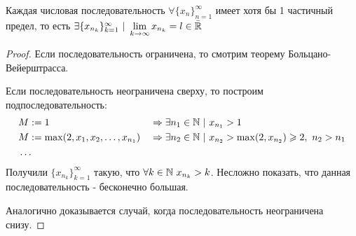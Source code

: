 \begin{addition}
	Каждая числовая последовательность $\forall \{x_n\}_{n = 1}^\infty$ имеет хотя бы 1 частичный предел, то есть $\exists \{x_{n_k}\}_{k = 1}^\infty\ |\ \lim\limits_{k \rightarrow \infty} x_{n_k} = l \in \bar{\mathbb{R}}$
\end{addition}

\begin{proof}
	Если последовательность ограничена, то смотрим теорему Больцано-Вейерштрасса.
	
	Если последовательность неограничена сверху, то построим подпоследовательность:
	\begin{align*}
		&M := 1 & &\Rightarrow \exists n_1 \in \mathbb{N}\ |\ x_{n_1} > 1
		\\
		&M := \max(2, x_1, x_2, \dots, x_{n_1}) & &\Rightarrow \exists n_2 \in \mathbb{N}\ |\ x_{n_2} > \max(2, x_{n_2}) \geqslant 2,\ n_2 > n_1
		\\
		&\dots
	\end{align*}
	Получили $\{x_{n_k}\}_{k = 1}^\infty$ такую, что $\forall k \in \mathbb{N}\ x_{n_k} > k$. Несложно показать, что данная последовательность - бесконечно большая.
	
	Аналогично доказывается случай, когда последовательность неограничена снизу.
\end{proof}


